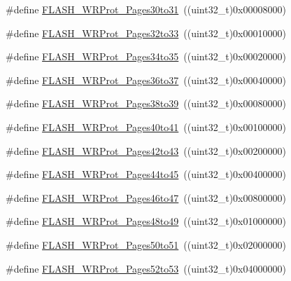 \begin{DoxyCompactItemize}
\item 
\#define \hyperlink{group___option___bytes___write___protection_gaabe41461f613c6eb37c782295ad9f90f}{F\+L\+A\+S\+H\+\_\+\+W\+R\+Prot\+\_\+\+Pages30to31}~((uint32\+\_\+t)0x00008000)
\item 
\#define \hyperlink{group___option___bytes___write___protection_ga86aa121a8917e58ad6bfdf98ba873d36}{F\+L\+A\+S\+H\+\_\+\+W\+R\+Prot\+\_\+\+Pages32to33}~((uint32\+\_\+t)0x00010000)
\item 
\#define \hyperlink{group___option___bytes___write___protection_gaa5fee32ae0631b81413414f8e716868b}{F\+L\+A\+S\+H\+\_\+\+W\+R\+Prot\+\_\+\+Pages34to35}~((uint32\+\_\+t)0x00020000)
\item 
\#define \hyperlink{group___option___bytes___write___protection_gab00dc29c0f12afd25cdb21b6d187ccc9}{F\+L\+A\+S\+H\+\_\+\+W\+R\+Prot\+\_\+\+Pages36to37}~((uint32\+\_\+t)0x00040000)
\item 
\#define \hyperlink{group___option___bytes___write___protection_gacd33bf5c4a305a271da6035ed19cefc2}{F\+L\+A\+S\+H\+\_\+\+W\+R\+Prot\+\_\+\+Pages38to39}~((uint32\+\_\+t)0x00080000)
\item 
\#define \hyperlink{group___option___bytes___write___protection_gaaf0c1391987f76b381d26ff4b5142268}{F\+L\+A\+S\+H\+\_\+\+W\+R\+Prot\+\_\+\+Pages40to41}~((uint32\+\_\+t)0x00100000)
\item 
\#define \hyperlink{group___option___bytes___write___protection_gab9583317ad7ec30119cdd97e17e74121}{F\+L\+A\+S\+H\+\_\+\+W\+R\+Prot\+\_\+\+Pages42to43}~((uint32\+\_\+t)0x00200000)
\item 
\#define \hyperlink{group___option___bytes___write___protection_ga934a862a6a5cd350f00f5ded27e4bbd4}{F\+L\+A\+S\+H\+\_\+\+W\+R\+Prot\+\_\+\+Pages44to45}~((uint32\+\_\+t)0x00400000)
\item 
\#define \hyperlink{group___option___bytes___write___protection_ga8c9bd2510c0af75911a6b24271a33c95}{F\+L\+A\+S\+H\+\_\+\+W\+R\+Prot\+\_\+\+Pages46to47}~((uint32\+\_\+t)0x00800000)
\item 
\#define \hyperlink{group___option___bytes___write___protection_ga12744383aa65b2eb38e37d41a12bb6fe}{F\+L\+A\+S\+H\+\_\+\+W\+R\+Prot\+\_\+\+Pages48to49}~((uint32\+\_\+t)0x01000000)
\item 
\#define \hyperlink{group___option___bytes___write___protection_ga053321e47944270a5fdcf0d58e16ec13}{F\+L\+A\+S\+H\+\_\+\+W\+R\+Prot\+\_\+\+Pages50to51}~((uint32\+\_\+t)0x02000000)
\item 
\#define \hyperlink{group___option___bytes___write___protection_gae4eefefb23e8913e4aa558a6a2599fa5}{F\+L\+A\+S\+H\+\_\+\+W\+R\+Prot\+\_\+\+Pages52to53}~((uint32\+\_\+t)0x04000000)

\end{DoxyCompactItemize}
